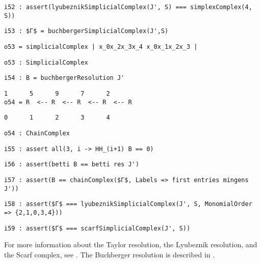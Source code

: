 \documentclass[12pt,leqno]{amsart}
\theoremstyle{definition}
\begin{document}
\begin{lstlisting}[xleftmargin=10pt, aboveskip=1.5pt, belowskip=1.5pt]
i52 : assert(lyubeznikSimplicialComplex(J', S) === simplexComplex(4, S))
\end{lstlisting}
\begin{lstlisting}[xleftmargin=10pt, aboveskip=1.5pt, belowskip=1.5pt]
i53 : $Γ$ = buchbergerSimplicialComplex(J',S)
\end{lstlisting}
\begin{lstlisting}[xleftmargin=10pt, aboveskip=1.5pt, belowskip=1.5pt]
o53 = simplicialComplex | x_0x_2x_3x_4 x_0x_1x_2x_3 |
\end{lstlisting}
\begin{lstlisting}[xleftmargin=10pt, aboveskip=1.5pt, belowskip=1.5pt]
o53 : SimplicialComplex
\end{lstlisting}
\begin{lstlisting}[xleftmargin=10pt, aboveskip=1.5pt, belowskip=1.5pt]
i54 : B = buchbergerResolution J'
\end{lstlisting}
\begin{lstlisting}[xleftmargin=10pt, lineskip=-10pt, aboveskip=1.5pt, belowskip=1.5pt]
       1      5      9      7      2
o54 = R  <-- R  <-- R  <-- R  <-- R
\end{lstlisting}
\begin{lstlisting}[xleftmargin=10pt, aboveskip=1.5pt, belowskip=1.5pt]
      0      1      2      3      4
\end{lstlisting}
\begin{lstlisting}[xleftmargin=10pt, aboveskip=1.5pt, belowskip=1.5pt]
o54 : ChainComplex
\end{lstlisting}
\begin{lstlisting}[xleftmargin=10pt, aboveskip=1.5pt, belowskip=1.5pt]
i55 : assert all(3, i -> HH_(i+1) B == 0) 
\end{lstlisting}
\begin{lstlisting}[xleftmargin=10pt, aboveskip=1.5pt, belowskip=1.5pt]
i56 : assert(betti B == betti res J')
\end{lstlisting}
\begin{lstlisting}[xleftmargin=10pt, aboveskip=1.5pt, belowskip=1.5pt]
i57 : assert(B == chainComplex($Γ$, Labels => first entries mingens J'))
\end{lstlisting}
\begin{lstlisting}[xleftmargin=10pt, aboveskip=1.5pt, belowskip=1.5pt]
i58 : assert($Γ$ === lyubeznikSimplicialComplex(J', S, MonomialOrder => {2,1,0,3,4}))
\end{lstlisting}
\begin{lstlisting}[xleftmargin=10pt, aboveskip=1.5pt, belowskip=3.0pt]
i59 : assert($Γ$ === scarfSimplicialComplex(J', S))
\end{lstlisting}
For more information about the Taylor resolution, the Lyubeznik resolution,
and the Scarf complex, see \cite{Mermin}.  The Buchberger resolution is
described in \cite{OW}.  \vfill
\end{document}
